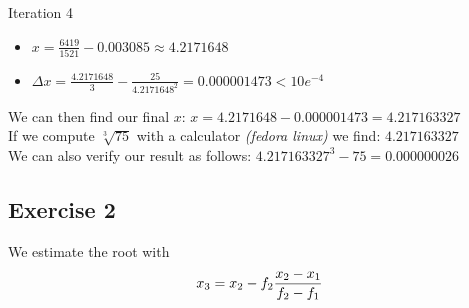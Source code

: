 \documentclass[12pt]{article}
\begin{document}
\noindent Iteration 4 \\
\begin{itemize}
  \item $x = \frac{6419}{1521} - 0.003085 \approx 4.2171648 $ \\
  \item $\Delta x = \frac{4.2171648}{3} - \frac{25}{4.2171648^2} = 0.000001473 < 10e^{-4}$ \\
\end{itemize}

\noindent We can then find our final $x$:
$ x = 4.2171648 - 0.000001473 = 4.217163327 $ \\

\noindent If we compute $\sqrt[3]{75}$ with a calculator \textit{(fedora linux)} we find: $4.217163327$ \\
\noindent We can also verify our result as follows: $4.217163327^3 - 75 = 0.000000026$

\subsection{Exercise 2}

We estimate the root with
\begin{align}
x_3 = x_2 - f_2 \frac{x_2-x_1}{f_2-f_1} \notag
\end{align}
\end{document}
